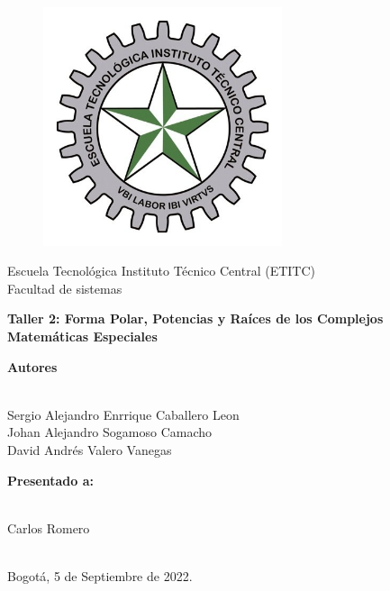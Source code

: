 \documentclass[a4paper,11pt,openany]{book}
\begin{document}
\begin{titlepage}
 
\begin{center}
\vspace*{-1in}
\begin{figure}[htb]
\begin{center}
\includegraphics[width=7cm]{ETITC.png}
\end{center}
\end{figure}
 
 
{\sc \huge Escuela Tecnológica Instituto Técnico Central (ETITC)}\\
\vspace*{0.15in}
Facultad de sistemas\\
\vspace*{0.6in}
\begin{Large}
\textbf{Taller 2: Forma Polar, Potencias y Raíces de los Complejos} \\
\textbf{Matem{\'a}ticas Especiales}\\
\end{Large}
\vspace*{0.3in}
\begin{large}
{\bf Autores} \\
 
\ 
 
Sergio Alejandro Enrrique Caballero Leon\\ 
Johan Alejandro Sogamoso Camacho \\
David Andrés Valero Vanegas \\
\end{large}
\vspace*{0.3in}
 
\end{center}
 
\begin{center}
{\bf Presentado a:} \\
 
\ 
 
Carlos Romero \\
 
\
 
Bogot{\'a}, 5 de Septiembre de 2022.
\end{center}
 
\end{titlepage}
\end{document}
